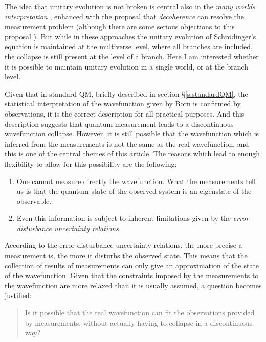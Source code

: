 \documentclass[11pt]{amsart}
\theoremstyle{definition}
\theoremstyle{plain}
\begin{document}
The idea that unitary evolution is not broken is central also in the \emph{many worlds interpretation} \cite{Eve57,Eve73,dWEG73,Vaidman2002MWI}, enhanced with the proposal that \emph{decoherence} can resolve the measurement problem \cite{Zeh96,Zurek2003Decoherence,schlosshauer2005decoherence} (although there are some serious objections to this proposal \cite{pessoa1997canDecoherence,leggett2002limitsQM,kastner2014einselection}). But while in these approaches the unitary evolution of Schr\"odinger's equation is maintained at the multiverse level, where all branches are included, the collapse is still present at the level of a branch. Here I am interested whether it is possible to maintain unitary evolution in a single world, or at the branch level.

Given that in standard QM, briefly described in section \S\ref{s:standardQM}, the statistical interpretation of the wavefunction given by Born is confirmed by observations, it is the correct description for all practical purposes. And this description suggests that quantum measurement leads to a discontinuous wavefunction collapse. However, it is still possible that the wavefunction which is inferred from the measurements is not the same as the real wavefunction, and this is one of the central themes of this article.
The reasons which lead to enough flexibility to allow for this possibility are the following:
\begin{enumerate}
	\item 
One cannot measure directly the wavefunction. What the measurements tell us is that the quantum state of the observed system is an eigenstate of the observable.
	\item 
Even this information is subject to inherent limitations given by the \emph{error-disturbance uncertainty relations} \cite{Heisenberg1927Uncertainty,Ozawa2003Heisenberg,Ozawa2013disprovingHeisenbergErrorDisturbance}. 
\end{enumerate}

According to the error-disturbance uncertainty relations, the more precise a measurement is, the more it disturbs the observed state. This means that the collection of results of measurements can only give an approximation of the state of the wavefunction. Given that the constraints imposed by the measurements to the wavefunction are more relaxed than it is usually assumed, a question becomes justified:

\begin{quote}
Is it possible that the real wavefunction can fit the observations provided by measurements, without actually having to collapse in a discontinuous way?
\end{quote}
\end{document}
